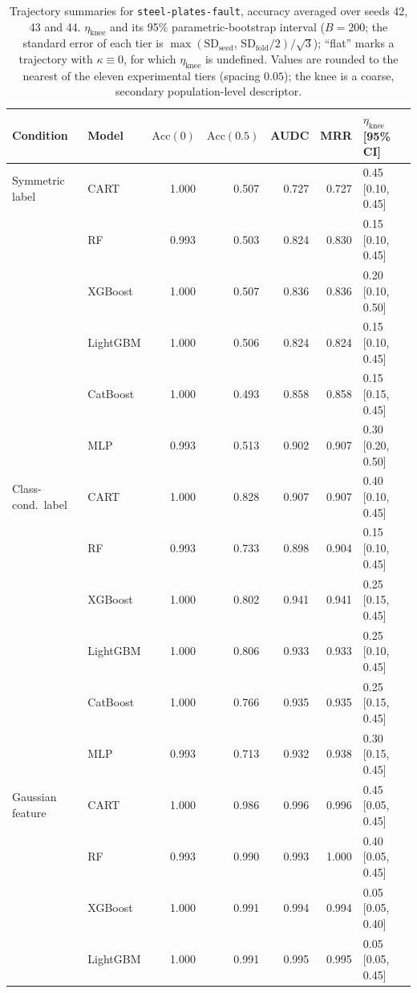 \begin{table}[p]
\centering
\scriptsize
\setlength{\tabcolsep}{3.5pt}
\caption{Trajectory summaries for \texttt{steel-plates-fault}, accuracy averaged over seeds 42, 43 and 44. $\eta_{\mathrm{knee}}$ and its 95\% parametric-bootstrap interval ($B=200$; the standard error of each tier is $\max(\mathrm{SD}_{\mathrm{seed}},\,\mathrm{SD}_{\mathrm{fold}}/2)/\sqrt3$); ``flat'' marks a trajectory with $\kappa\equiv 0$, for which $\eta_{\mathrm{knee}}$ is undefined. Values are rounded to the nearest of the eleven experimental tiers (spacing $0.05$); the knee is a coarse, secondary population-level descriptor.}
\label{tab:traj_steel_plates_fault}
\begin{tabular}{@{}llrrrrl@{}}
\toprule
Condition & Model & $\mathrm{Acc}(0)$ & $\mathrm{Acc}(0.5)$ & AUDC & MRR & $\eta_{\mathrm{knee}}$ [95\% CI] \\
\midrule
Symmetric label & CART & 1.000 & 0.507 & 0.727 & 0.727 & 0.45 [0.10, 0.45] \\
 & RF & 0.993 & 0.503 & 0.824 & 0.830 & 0.15 [0.10, 0.45] \\
 & XGBoost & 1.000 & 0.507 & 0.836 & 0.836 & 0.20 [0.10, 0.50] \\
 & LightGBM & 1.000 & 0.506 & 0.824 & 0.824 & 0.15 [0.10, 0.45] \\
 & CatBoost & 1.000 & 0.493 & 0.858 & 0.858 & 0.15 [0.15, 0.45] \\
 & MLP & 0.993 & 0.513 & 0.902 & 0.907 & 0.30 [0.20, 0.50] \\
\midrule
Class-cond.\ label & CART & 1.000 & 0.828 & 0.907 & 0.907 & 0.40 [0.10, 0.45] \\
 & RF & 0.993 & 0.733 & 0.898 & 0.904 & 0.15 [0.10, 0.45] \\
 & XGBoost & 1.000 & 0.802 & 0.941 & 0.941 & 0.25 [0.15, 0.45] \\
 & LightGBM & 1.000 & 0.806 & 0.933 & 0.933 & 0.25 [0.10, 0.45] \\
 & CatBoost & 1.000 & 0.766 & 0.935 & 0.935 & 0.25 [0.15, 0.45] \\
 & MLP & 0.993 & 0.713 & 0.932 & 0.938 & 0.30 [0.15, 0.45] \\
\midrule
Gaussian feature & CART & 1.000 & 0.986 & 0.996 & 0.996 & 0.45 [0.05, 0.45] \\
 & RF & 0.993 & 0.990 & 0.993 & 1.000 & 0.40 [0.05, 0.45] \\
 & XGBoost & 1.000 & 0.991 & 0.994 & 0.994 & 0.05 [0.05, 0.40] \\
 & LightGBM & 1.000 & 0.991 & 0.995 & 0.995 & 0.05 [0.05, 0.45] \\

\end{tabular}
\end{table}
